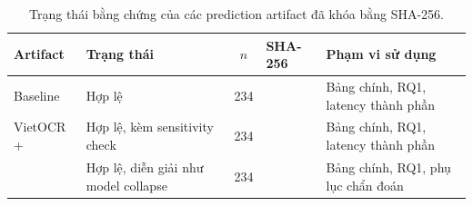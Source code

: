 \begin{table}[htbp]
  \centering
  \caption{Trạng thái bằng chứng của các prediction artifact đã khóa bằng SHA-256.}
  \label{tab:artifact-validity}
  \small
  \begin{tabularx}{\textwidth}{lL{3cm}cL{2.7cm}X}
    \toprule
    \textbf{Artifact} & \textbf{Trạng thái} & \textbf{$n$} & \textbf{SHA-256} & \textbf{Phạm vi sử dụng} \\
    \midrule
Baseline & Hợp lệ & 234 &  & Bảng chính, RQ1, latency thành phần \\
VietOCR +  & Hợp lệ, kèm sensitivity check & 234 &  & Bảng chính, RQ1, latency thành phần \\
 & Hợp lệ, diễn giải như model collapse & 234 &  & Bảng chính, RQ1, phụ lục chẩn đoán \\
    \bottomrule
  \end{tabularx}
\end{table}
